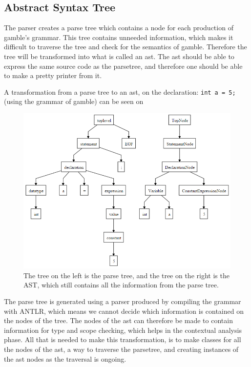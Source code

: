 \subsection*{Abstract Syntax Tree}\label{sec:AST}
The parser creates a parse tree which contains a node for each production of \gls{gamble}'s grammar.
This tree contains unneeded information, which makes it difficult to traverse the tree and check for the semantics of \gls{gamble}.
Therefore the tree will be transformed into what is called an \acrfull{ast}.
The \acrshort{ast} should be able to express the same source code as the parsetree, and therefore one should be able to make a pretty printer from it.


A transformation from a parse tree to an \acrshort{ast}, on the declaration: \texttt{int a = 5;} (using the grammar of \gls{gamble}) can be seen on 

\begin{figure}
		\centering
	 	\includegraphics[width=0.8\linewidth]{figures/Trees/AST.PNG}
		\caption{The tree on the left is the parse tree, and the tree on the right is the AST, which still contains all the information from the parse tree.}\label{image:AST}
\end{figure}

The parse tree is generated using a parser produced by compiling the grammar with ANTLR, which means we cannot decide which information is contained on the nodes of the tree.
The nodes of the \acrshort{ast} can therefore be made to contain information for type and scope checking, which helps in the contextual analysis phase.
All that is needed to make this transformation, is to make classes for all the nodes of the \acrshort{ast}, a way to traverse the parsetree, and creating instances of the \acrshort{ast} nodes as the traversal is ongoing.



